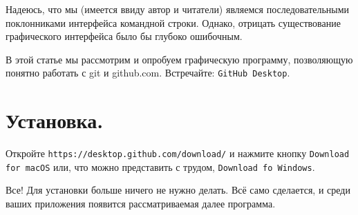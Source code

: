 \documentclass[12pt,a4paper]{article}
\begin{document}
Надеюсь, что мы (имеется ввиду автор и читатели) являемся последовательными поклонниками
интерфейса командной строки. Однако, отрицать существование графического интерфейса было бы
глубоко ошибочным.

В этой статье мы рассмотрим и опробуем графическую программу, позволяющую понятно работать
с git и github.com. Встречайте: \texttt{GitHub Desktop}.

\section{Установка.}
Откройте \texttt{https://desktop.github.com/download/} и нажмите кнопку \texttt{Download for macOS}
 или, что можно представить с трудом, \texttt{Download fo Windows}.

Все! Для установки больше ничего не нужно делать. Всё само сделается, и среди ваших приложения
появится рассматриваемая далее программа.
\end{document}

